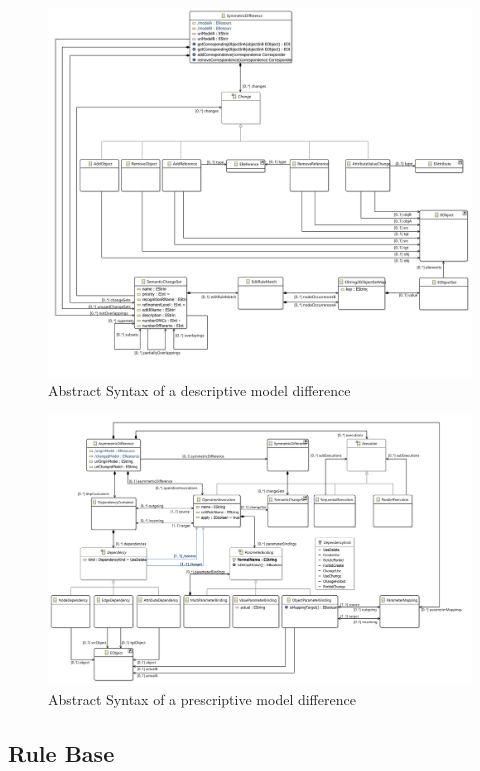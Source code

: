 \begin{figure}[h!]
\centering
\includegraphics[width=\textwidth]{images/architecture/symmetric_model}
\caption{Abstract Syntax of a descriptive model difference}
\label{fig:symmetric_model}
\end{figure}

\begin{figure}[h!]
\centering
\includegraphics[width=\textwidth]{images/architecture/asymmetric_model}
\caption{Abstract Syntax of a prescriptive model difference}
\end{figure}

\newpage


\subsection{Rule Base}

